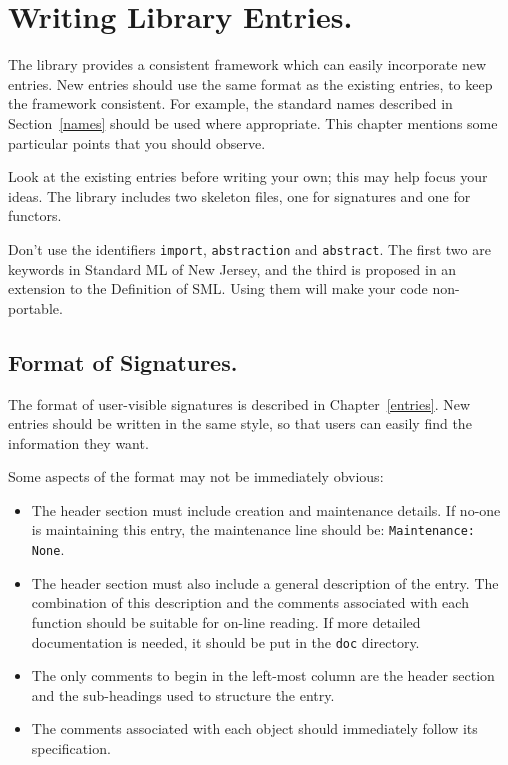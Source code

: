 %
%

\chapter{Writing Library Entries.}		\label{implement}

The library provides a consistent framework which can easily incorporate
new entries.  New entries should use the same format as the existing
entries, to keep the framework consistent.  For example, the standard
names described in Section~\ref{names} should be used where appropriate.
This chapter mentions some particular points that you should observe.

Look at the existing entries before writing your own; this may
help focus your ideas.  The library includes two skeleton files, one for
signatures and one for functors.

Don't use the identifiers {\tt import}, {\tt abstraction} and {\tt abstract}.
The first two are keywords in Standard ML of New Jersey, and the third
is proposed in an extension to the Definition of SML.  Using them will
make your code non-portable.
 

\section{Format of Signatures.}

The format of user-visible signatures is described in Chapter~\ref{entries}.  
New entries should be written in the same style, so that users can
easily find the information they want.

Some aspects of the format may not be immediately obvious:
\begin{itemize}
  \item The header section must include creation and maintenance details.
	If no-one is maintaining this entry, the maintenance line should
	be: {\tt Maintenance: None}.
  \item The header section must also include a general description of
	the entry.  The combination of this description and the comments
	associated with each function should be suitable for on-line reading.
	If more detailed documentation is needed, it should be put
	in the {\tt doc} directory.
  \item The only comments to begin in the left-most column are the header
	section and the sub-headings used to structure the entry.
  \item The comments associated with each object should immediately follow
	its specification.
\end{itemize}


